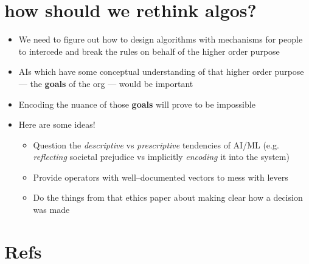 \documentclass[10pt]{article}
\begin{document}
  \section{how should we rethink algos?}
    \begin{itemize}
      \item We need to figure out how to design algorithms with mechanisms for people to intercede and break the rules on behalf of the higher order purpose
      \item AIs which have some conceptual understanding of that higher order purpose --- the \textbf{goals} of the org --- would be important
      \item Encoding the nuance of those \textbf{goals} will prove to be impossible
      \item Here are some ideas!
      \begin{itemize}
        \item Question the \textit{descriptive} vs \textit{prescriptive} tendencies of AI/ML
              (e.g. \textit{reflecting} societal prejudice vs implicitly \textit{encoding} it into the system)
        \item Provide operators with well--documented vectors to mess with levers
        \item Do the things from that ethics paper about making clear how a decision was made
      \end{itemize}
    \end{itemize}


\section{Refs}
\printbibliography[heading=none]
\end{document}
